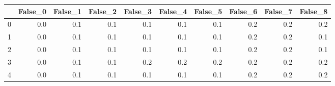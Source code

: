 \begin{tabular}{lrrrrrrrrr}
\toprule
{} &  False\_0 &  False\_1 &  False\_2 &  False\_3 &  False\_4 &  False\_5 &  False\_6 &  False\_7 &  False\_8 \\ \hline
\midrule
0 &      0.0 &      0.1 &      0.1 &      0.1 &      0.1 &      0.1 &      0.2 &      0.2 &      0.2 \\ \hline
1 &      0.0 &      0.1 &      0.1 &      0.1 &      0.1 &      0.1 &      0.2 &      0.2 &      0.1 \\ \hline
2 &      0.0 &      0.1 &      0.1 &      0.1 &      0.1 &      0.1 &      0.2 &      0.2 &      0.1 \\ \hline
3 &      0.0 &      0.1 &      0.1 &      0.2 &      0.2 &      0.2 &      0.2 &      0.2 &      0.2 \\ \hline
4 &      0.0 &      0.1 &      0.1 &      0.1 &      0.1 &      0.1 &      0.2 &      0.2 &      0.2 \\ \hline
\bottomrule
\end{tabular}
